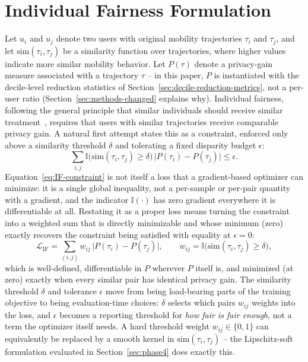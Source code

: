 \section{Individual Fairness Formulation}
\label{sec:individual-fairness}

Let $u_i$ and $u_j$ denote two users with original mobility
trajectories $\tau_i$ and $\tau_j$, and let $\mathrm{sim}(\tau_i,
\tau_j)$ be a similarity function over trajectories, where higher
values indicate more similar mobility behavior. Let $P(\tau)$ denote a
privacy-gain measure associated with a trajectory $\tau$ -- in this
paper, $P$ is instantiated with the decile-level reduction statistics
of Section~\ref{sec:decile-reduction-metrics}, not a per-user ratio
(Section~\ref{sec:methods-changed} explains why). Individual fairness,
following the general principle that similar individuals should
receive similar treatment~\cite{dwork2012fairness}, requires that
users with similar trajectories receive comparable privacy gain. A
natural first attempt states this as a constraint, enforced only above
a similarity threshold $\delta$ and tolerating a fixed disparity budget
$\epsilon$:
\begin{equation}
\sum_{i,j} \mathbb{I}\big(\mathrm{sim}(\tau_i,\tau_j) \ge \delta\big)\,
\big|P(\tau_i) - P(\tau_j)\big| \le \epsilon.
\label{eq:IF-constraint}
\end{equation}
Equation~\ref{eq:IF-constraint} is not itself a loss that a gradient-based
optimizer can minimize: it is a single global inequality, not a
per-sample or per-pair quantity with a gradient, and the indicator
$\mathbb{I}(\cdot)$ has zero gradient everywhere it is differentiable
at all. Restating it as a proper loss means turning the constraint
into a weighted sum that is directly minimizable and whose minimum
(zero) exactly recovers the constraint being satisfied with equality
at $\epsilon=0$:
\begin{equation}
\mathcal{L}_{\mathrm{IF}} = \sum_{(i,j)} w_{ij}\,\big|P(\tau_i) - P(\tau_j)\big|,
\qquad
w_{ij} = \mathbb{I}\big(\mathrm{sim}(\tau_i,\tau_j) \ge \delta\big),
\label{eq:IF-loss}
\end{equation}
which is well-defined, differentiable in $P$ wherever $P$ itself is,
and minimized (at zero) exactly when every similar pair has identical
privacy gain. The similarity threshold $\delta$ and tolerance
$\epsilon$ move from being load-bearing parts of the training
objective to being evaluation-time choices: $\delta$ selects which
pairs $w_{ij}$ weights into the loss, and $\epsilon$ becomes a
reporting threshold for \emph{how fair is fair enough}, not a term the
optimizer itself needs. A hard threshold weight $w_{ij}\in\{0,1\}$ can
equivalently be replaced by a smooth kernel in $\mathrm{sim}(\tau_i,\tau_j)$
-- the Lipschitz-soft formulation evaluated in
Section~\ref{sec:phase4} does exactly this.

